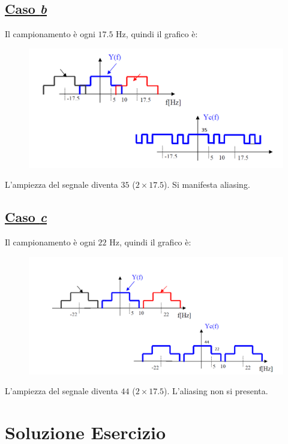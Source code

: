 \documentclass[a4paper]{article}
\begin{document}
	\subsection*{\textcolor{Green4}{\underline{Caso \emph{b}}}}
	
	Il campionamento è ogni $17.5$ Hz, quindi il grafico è:
	\begin{figure}[!htp]
		\centering
		\includegraphics[width=\textwidth]{img/fig_7.png}
	\end{figure}
	
	\noindent
	L'ampiezza del segnale diventa $35$ ($2 \times 17.5$). Si manifesta aliasing.
	
	\subsection*{\textcolor{Green4}{\underline{Caso \emph{c}}}}
	
	Il campionamento è ogni $22$ Hz, quindi il grafico è:
	\begin{figure}[!htp]
		\centering
		\includegraphics[width=\textwidth]{img/fig_8.png}
	\end{figure}
	
	\noindent
	L'ampiezza del segnale diventa $44$ ($2 \times 17.5$). L'aliasing non si presenta.\newpage
	
	\section{Soluzione Esercizio}
	
\end{document}
